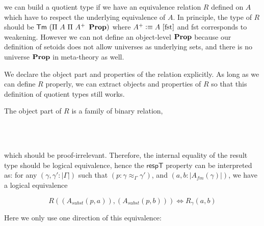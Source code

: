 we can build a quotient type if we have an equivalence relation $R$ defined on $A$ which have to respect the underlying equivalence of $A$.
In principle, the type of $R$ should be $\mathsf{Tm} ~ (\Pi ~A ~ \Pi ~A^{+} ~\operatorname{\mathbf{Prop}})$ where $A^{+} \vcentcolon\equiv A ~[\text{fst}]$ and fst corresponds to weakening. However we can not define an object-level $\operatorname{\mathbf{Prop}}$ because our definition of setoids does not allow universes as underlying sets, and there is no universe $\operatorname{\mathbf{Prop}}$ in meta-theory as well.

 We declare the object part and properties of the relation explicitly. As long as we can define $R$ properly, we can extract objects and properties of $R$ so that this definition of quotient types still works.

The object part of $R$ is a family of binary relation, 

\begin{code}
%
\\
\>[0]\<[9]%
\>[9]\AgdaSymbol{(} \AgdaSymbol{:} \AgdaSymbol{(} \AgdaSymbol{:}   \AgdaSymbol{)}   \AgdaFunction{[}  \AgdaFunction{]fm}     \AgdaFunction{[}  \AgdaFunction{]fm}    \AgdaSymbol{)}\<%
\\
\end{code}

which should be proof-irrelevant. Therefore, the internal equality of the result type should be logical equivalence, hence the $\mathsf{respT}$ property can be interpreted as: for any $(\gamma , \gamma' : | \Gamma |)$ such that $(p : \gamma \approx_{\Gamma} \gamma')$, and $(a, b : | A_{fm}(\gamma)|)$, we have a logical equivalence


$$R ((A_{subst}(p,a)),(A_{subst}(p,b))) \iff R_{\gamma}(a,b)$$ 

Here we only use one direction of this equivalence:

